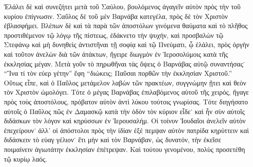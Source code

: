 Ἐλάλει δὲ καὶ συνεζήτει μετὰ τοῦ Σαύλου, βουλόμενος
ἀγαγεῖν αὐτὸν πρὸς τὴν τοῦ κυρίου ἐπίγνωσιν. Σαῦλος
δὲ τοῦ μὲν Βαρνάβα κατεγέλα, πρὸς δὲ τὸν Χριστὸν
ἐβλασφήμει. Βλέπων δὲ καὶ τὰ παρὰ τῶν ἀποστόλων
γινόμενα θαύματα καὶ τὸ πλῆθος προστιθέμενον τῷ λόγῳ
τῆς πίστεως, ἐδάκνετο τὴν ψυχήν, καὶ προσβαλὼν τῷ
Στεφάνῳ καὶ μὴ δυνηθεὶς ἀντιστῆναι τῇ σοφίᾳ καὶ
τῷ Πνεύματι, ᾧ ἐλάλει, πρὸς ὀργὴν καὶ τοῦτον ἀνελὼν
διὰ τῶν ἀτάκτων, ἤγειρε διωγμὸν ἐν Ἱεροσολύμοις κατὰ
τῆς ἐκκλησίας μέγαν. Μετὰ γοῦν τὸ πηρωθῆναι τὰς
ὄψεις ὁ Βαρνάβας αὐτῷ συναντήσας˙ \enquote{Ἵνα τί τὸν εὐερ%
γέτην} ἔφη \enquote{διώκεις; Παῦσαι πορθῶν τὴν ἐκκλησίαν
Χριστοῦ.} Οὕτως εἶπε, καὶ ὁ Παῦλος μετάμελον λαβὼν
τῶν πρακτέων, συγγνώμην ᾔτει καὶ θεὸν τὸν Χριστὸν
ὡμολόγει. Τότε ὁ μέγας Βαρνάβας ἐπιλαβόμενος αὐτοῦ
τῆς χειρός, ἤγαγε πρὸς τοὺς ἀποστόλους, πρόβατον
αὐτὸν ἀντὶ λύκου τούτοις γνωρίσας. Τότε διηγήσατο
αὐτοῖς ὁ Παῦλος πῶς ἐν Δαμασκῷ κατὰ τὴν ὁδὸν τὸν
κύριον εἶδε˙ καὶ ἦν σὺν αὐτοῖς διδάσκων τὸν λόγον
καὶ κηρύσσων ἐν Ἱερουσαλήμ. Οἱ τοίνυν Ἰουδαῖοι ἀνελεῖν
αὐτὸν ἐπεχείρουν˙ ἀλλ’ οἱ ἀπόστολοι πρὸς τὴν ἰδίαν ἐξέ%
πεμψαν αὐτὸν πατρίδα κηρύττειν καὶ διδάσκειν τὸ εὐαγ%
γέλιον˙ ἔτι μὴν καὶ τὸν Βαρνάβαν, ὡς δυνατόν, τὴν
ἐκεῖσε ποιμαίνειν ἁγιωτάτην ἐκκλησίαν ἐπέτρεψαν. Καὶ
τούτου γενομένου, πολὺς προσετέθη τῷ κυρίῳ λαός.

